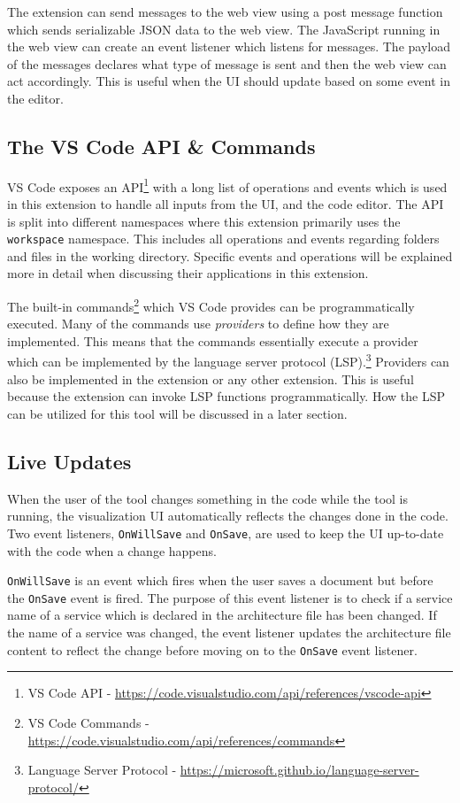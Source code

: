 The extension can send messages to the web view using a post message function which sends serializable JSON data to the web view.
The JavaScript running in the web view can create an event listener which listens for messages. The payload of the messages declares what type of message is sent and then the web view can act accordingly.
This is useful when the UI should update based on some event in the editor.

\subsection{The VS Code API \& Commands}
VS Code exposes an API\footnote{VS Code API - \url{https://code.visualstudio.com/api/references/vscode-api}} with a long list of operations and events
which is used in this extension to handle all inputs from the UI, and the code editor.
The API is split into different namespaces where this extension primarily uses the \texttt{workspace}
namespace. This includes all operations and events regarding folders and files in the working directory.
Specific events and operations will be explained more in detail when discussing their applications in this extension.

The built-in commands\footnote{VS Code Commands - \url{https://code.visualstudio.com/api/references/commands}} which VS Code provides can be programmatically executed.
Many of the commands use \emph{providers} to define how they are implemented. This means that the commands essentially execute a provider which can be implemented by the language server protocol (LSP).\footnote{Language Server Protocol - \url{https://microsoft.github.io/language-server-protocol/}}
Providers can also be implemented in the extension or any other extension.
This is useful because the extension can invoke LSP functions programmatically. How the LSP can be utilized for this tool will be discussed in a later section.

\subsection{Live Updates}
When the user of the tool changes something in the code while the tool is running, the visualization UI automatically reflects the changes done in the code.
Two event listeners, \texttt{OnWillSave} and \texttt{OnSave}, are used to keep the UI up-to-date with the code when a change happens.

\texttt{OnWillSave} is an event which fires when the user saves a document but before the \texttt{OnSave} event is fired. The purpose of this event listener is
to check if a service name of a service which is declared in the architecture file has been changed. If the name of a service was changed, the event listener updates the architecture file content to reflect the change before moving on to the \texttt{OnSave} event listener.

